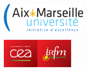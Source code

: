 \thispagestyle{empty}
\vspace*{-2.0cm}
\begin{center}
  \begin{minipage}[c]{0.70\linewidth}
    \raggedright\includegraphics[height=1.5cm]{Figs/logo_amu_excellence}
  \end{minipage}\hfill
  \begin{minipage}[c]{0.30\linewidth}
    \raggedleft\includegraphics[height=1.5cm]{Figs/CEA_logo_quadri-sur-fond-rouge}\quad\includegraphics[height=1.5cm]{Figs/IRFM_rouge}
 \end{minipage}\hfill
\end{center}
